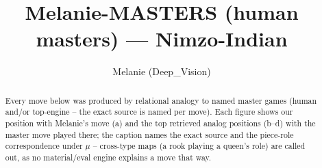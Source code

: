 \documentclass[11pt]{article}
\title{Melanie-MASTERS (human masters) — Nimzo-Indian}
\author{Melanie (Deep\_Vision)}
\date{}
\begin{document}
\maketitle

\begin{abstract}Every move below was produced by relational analogy to named master games (human and/or top-engine -- the exact source is named per move). Each figure shows our position with Melanie's move (a) and the top retrieved analog positions (b--d) with the master move played there; the caption names the exact source and the piece-role correspondence under $\mu$ -- cross-type maps (a rook playing a queen's role) are called out, as no material/eval engine explains a move that way.\end{abstract}

\begin{figure}[p]\centering
\begin{subfigure}{0.46\textwidth}\centering
\resizebox{\linewidth}{!}{%
\newchessgame
\chessboard[
  setfen={rnbq1rk1/pp3ppp/4pn2/2pp4/1bPP4/2NBPN2/PP3PPP/R1BQK2R w KQ - 0 7},
  showmover=false,
  pgfstyle=straightmove, color=movearrow, markmove={c4-d5}
]}
\caption{}
\end{subfigure}\hfill
\begin{subfigure}{0.46\textwidth}\centering
\resizebox{\linewidth}{!}{%
\newchessgame
\chessboard[
  setfen={rnbq1rk1/pp3pbp/3p1np1/2pp4/2P1PB2/2NB1P2/PP1Q2PP/R3K1NR w KQ - 0 11},
  showmover=false,
  pgfstyle=straightmove, color=movearrow, markmove={e4-d5}
]}
\caption{}
\end{subfigure}
\\[4pt]
\begin{subfigure}{0.46\textwidth}\centering
\resizebox{\linewidth}{!}{%
\newchessgame
\chessboard[
  setfen={rn3rk1/ppq1ppbp/3p1np1/2pb4/2NP1B1P/2P1PN2/PP2BPP1/2RQK2R w K - 5 11},
  showmover=false,
  pgfstyle=straightmove, color=movearrow, markmove={b2-b3}
]}
\caption{}
\end{subfigure}\hfill
\begin{subfigure}{0.46\textwidth}\centering
\resizebox{\linewidth}{!}{%
\newchessgame
\chessboard[
  setfen={r1bq1rk1/2p2ppp/pb1p1n2/np2p3/3PP3/1BP1BN2/PP3PPP/RN1QR1K1 w - - 3 11},
  showmover=false,
  pgfstyle=straightmove, color=movearrow, markmove={b3-c2}
]}
\caption{}
\end{subfigure}

\end{figure}
\end{document}
